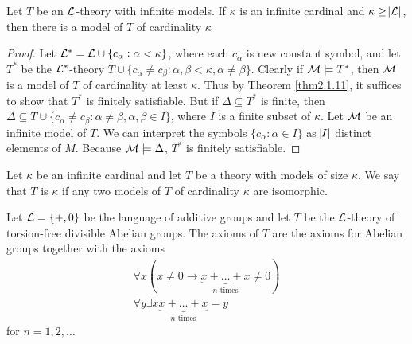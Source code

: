 \documentclass[11pt]{article}
\begin{document}
\begin{proposition}[]
Let \(T\) be an \(\mathcal{L}\)-theory with infinite models. If \(\kappa\) is an infinite
cardinal and \(\kappa\ge\abs{\mathcal{L}}\), then there is a model of \(T\) of
cardinality \(\kappa\)
\end{proposition}

\begin{proof}
Let \(\mathcal{L}^*=\mathcal{L}\cup\{c_\alpha:\alpha<\kappa\}\), where each \(c_\alpha\) is
new constant symbol, and let \(T^*\) be the \(\mathcal{L}^*\)-theory
\(T\cup\{c_\alpha\neq c_\beta:\alpha,\beta<\kappa,\alpha\neq\beta\}\). Clearly
if \(\mathcal{M}\models T^*\), then \(\mathcal{M}\) is a model of \(T\) of cardinality at least
\(\kappa\).
Thus by Theorem \ref{thm2.1.11}, it suffices to show that \(T^*\) is finitely
satisfiable. But if \(\Delta\subseteq T^*\) is finite, then \(\Delta\subseteq
   T\cup\{c_\alpha\neq c_\beta:\alpha\neq\beta,\alpha,\beta\in I\}\), where \(I\)
is a finite subset of \(\kappa\). Let \(\mathcal{M}\) be an infinite model of \(T\). We can
interpret the symbols \(\{c_\alpha:\alpha\in I\}\) as \(\abs{I}\) distinct
elements of \(M\). Because \(\mathcal{M}\models\Delta\), \(T^*\) is finitely satisfiable.
\end{proof}

\begin{definition}[]
Let \(\kappa\) be an infinite cardinal and let \(T\) be a theory with models of
size \(\kappa\). We say that \(T\) is \(\kappa\) if any two models of
\(T\) of cardinality \(\kappa\) are isomorphic.
\end{definition}

Let \(\mathcal{L}=\{+,0\}\) be the language of additive groups and let \(T\) be the
\(\mathcal{L}\)-theory of torsion-free divisible Abelian groups. The axioms of \(T\)
are the axioms for Abelian groups together with the axioms
\begin{gather*}
\forall x(x\neq 0\to\underbrace{x+\dots+x}_{n\text{-times}}\neq 0)\\
\forall y\exists x\underbrace{x+\dots+x}_{n\text{-times}}=y
\end{gather*}
for \(n=1,2,\dots\)
\end{document}
